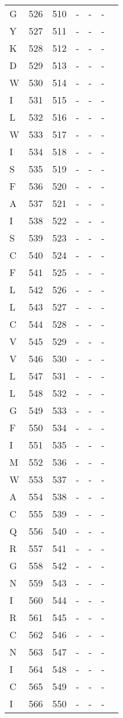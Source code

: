 \documentclass[10pt]{article}
\begin{document}
\begin{longtable}{lllllll}
  G & 526 & 510 & - & - & - &  \\ 
  Y & 527 & 511 & - & - & - &  \\ 
  K & 528 & 512 & - & - & - &  \\ 
  D & 529 & 513 & - & - & - &  \\ 
  W & 530 & 514 & - & - & - &  \\ 
  I & 531 & 515 & - & - & - &  \\ 
  L & 532 & 516 & - & - & - &  \\ 
  W & 533 & 517 & - & - & - &  \\ 
  I & 534 & 518 & - & - & - &  \\ 
  S & 535 & 519 & - & - & - &  \\ 
  F & 536 & 520 & - & - & - &  \\ 
  A & 537 & 521 & - & - & - &  \\ 
  I & 538 & 522 & - & - & - &  \\ 
  S & 539 & 523 & - & - & - &  \\ 
  C & 540 & 524 & - & - & - &  \\ 
  F & 541 & 525 & - & - & - &  \\ 
  L & 542 & 526 & - & - & - &  \\ 
  L & 543 & 527 & - & - & - &  \\ 
  C & 544 & 528 & - & - & - &  \\ 
  V & 545 & 529 & - & - & - &  \\ 
  V & 546 & 530 & - & - & - &  \\ 
  L & 547 & 531 & - & - & - &  \\ 
  L & 548 & 532 & - & - & - &  \\ 
  G & 549 & 533 & - & - & - &  \\ 
  F & 550 & 534 & - & - & - &  \\ 
  I & 551 & 535 & - & - & - &  \\ 
  M & 552 & 536 & - & - & - &  \\ 
  W & 553 & 537 & - & - & - &  \\ 
  A & 554 & 538 & - & - & - &  \\ 
  C & 555 & 539 & - & - & - &  \\ 
  Q & 556 & 540 & - & - & - &  \\ 
  R & 557 & 541 & - & - & - &  \\ 
  G & 558 & 542 & - & - & - &  \\ 
  N & 559 & 543 & - & - & - &  \\ 
  I & 560 & 544 & - & - & - &  \\ 
  R & 561 & 545 & - & - & - &  \\ 
  C & 562 & 546 & - & - & - &  \\ 
  N & 563 & 547 & - & - & - &  \\ 
  I & 564 & 548 & - & - & - &  \\ 
  C & 565 & 549 & - & - & - &  \\ 
  I & 566 & 550 & - & - & - &  \\ \hline
\end{longtable}
\end{document}
